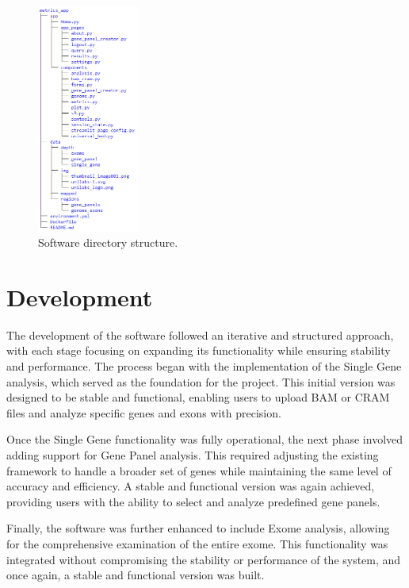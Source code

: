 \begin{figure}[H]
    \centering
    \includegraphics[width=0.3\textwidth]{figs/tree.png}
    \caption{Software directory structure.} 
    \label{fig:tree}
\end{figure}


\section{Development}

The development of the software followed an iterative and structured approach, with each stage focusing on expanding its functionality while ensuring stability and performance. The process began with the implementation of the Single Gene analysis, which served as the foundation for the project. This initial version was designed to be stable and functional, enabling users to upload BAM or CRAM files and analyze specific genes and exons with precision.

Once the Single Gene functionality was fully operational, the next phase involved adding support for Gene Panel analysis. This required adjusting the existing framework to handle a broader set of genes while maintaining the same level of accuracy and efficiency. A stable and functional version was again achieved, providing users with the ability to select and analyze predefined gene panels.

Finally, the software was further enhanced to include Exome analysis, allowing for the comprehensive examination of the entire exome. This functionality was integrated without compromising the stability or performance of the system, and once again, a stable and functional version was built.

